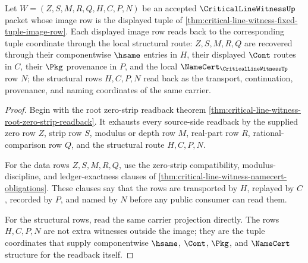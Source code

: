 \begin{theorem}
\label{thm:critical-line-witness-fixed-tuple-readback-row}
Let $W=(Z,S,M,R,Q,H,C,P,N)$ be an accepted $\CriticalLineWitnessUp$ packet whose image row is the displayed tuple of \autoref{thm:critical-line-witness-fixed-tuple-image-row}. Each displayed image row reads back to the corresponding tuple coordinate through the local structural route: $Z,S,M,R,Q$ are recovered through their componentwise $\hsame$ entries in $H$, their displayed $\Cont$ routes in $C$, their $\Pkg$ provenance in $P$, and the local $\NameCert_{\CriticalLineWitnessUp}$ row $N$; the structural rows $H,C,P,N$ read back as the transport, continuation, provenance, and naming coordinates of the same carrier.
\end{theorem}
\begin{proof}
Begin with the root zero-strip readback theorem \autoref{thm:critical-line-witness-root-zero-strip-readback}. It exhausts every source-side readback by the supplied zero row $Z$, strip row $S$, modulus or depth row $M$, real-part row $R$, rational-comparison row $Q$, and the structural route $H,C,P,N$.

For the data rows $Z,S,M,R,Q$, use the zero-strip compatibility, modulus-discipline, and ledger-exactness clauses of \autoref{thm:critical-line-witness-namecert-obligations}. These clauses say that the rows are transported by $H$, replayed by $C$, recorded by $P$, and named by $N$ before any public consumer can read them.

For the structural rows, read the same carrier projection directly. The rows $H,C,P,N$ are not extra witnesses outside the image; they are the tuple coordinates that supply componentwise $\hsame$, $\Cont$, $\Pkg$, and $\NameCert$ structure for the readback itself.
\end{proof}

